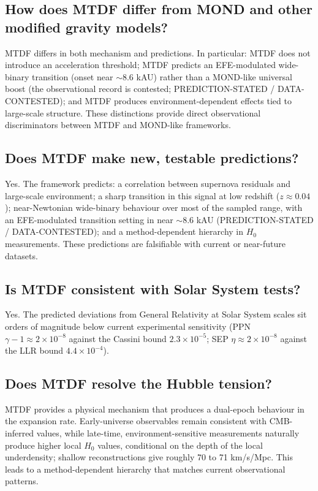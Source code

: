 \documentclass[11pt,a4paper]{article}
\begin{document}
\subsection{How does MTDF differ from MOND and other modified gravity models?}
MTDF differs in both mechanism and predictions. In particular: MTDF does not introduce an acceleration threshold; MTDF predicts an EFE-modulated wide-binary transition (onset near $\sim 8.6$ kAU) rather than a MOND-like universal boost (the observational record is contested; PREDICTION-STATED / DATA-CONTESTED); and MTDF produces environment-dependent effects tied to large-scale structure. These distinctions provide direct observational discriminators between MTDF and MOND-like frameworks.

\subsection{Does MTDF make new, testable predictions?}
Yes. The framework predicts: a correlation between supernova residuals and large-scale environment; a sharp transition in this signal at low redshift ($z \approx 0.04$); near-Newtonian wide-binary behaviour over most of the sampled range, with an EFE-modulated transition setting in near $\sim 8.6$ kAU (PREDICTION-STATED / DATA-CONTESTED); and a method-dependent hierarchy in $H_0$ measurements. These predictions are falsifiable with current or near-future datasets.

\subsection{Is MTDF consistent with Solar System tests?}
Yes. The predicted deviations from General Relativity at Solar System scales sit orders of magnitude below current experimental sensitivity (PPN $\gamma - 1 \approx 2\times10^{-8}$ against the Cassini bound $2.3\times10^{-5}$; SEP $\eta \approx 2\times10^{-8}$ against the LLR bound $4.4\times10^{-4}$).

\subsection{Does MTDF resolve the Hubble tension?}
MTDF provides a physical mechanism that produces a dual-epoch behaviour in the expansion rate. Early-universe observables remain consistent with CMB-inferred values, while late-time, environment-sensitive measurements naturally produce higher local $H_0$ values, conditional on the depth of the local underdensity; shallow reconstructions give roughly 70 to 71 km/\allowbreak{}s/\allowbreak{}Mpc. This leads to a method-dependent hierarchy that matches current observational patterns.
\end{document}
